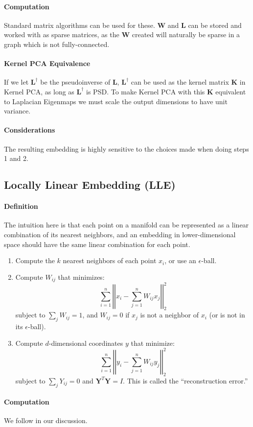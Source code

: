 \documentclass[12pt,a4paper]{article}
\newcommand{\1}[1]{\mathds{1}\left[#1\right]}
\newcommand{\B}[1]{\mathbf{#1}}
\begin{document}
\paragraph{Computation} Standard matrix algorithms can be used for these. $\B W$ and $\B L$ can be stored and worked with as sparse matrices, as the $\B W$ created will naturally be sparse in a graph which is not fully-connected.
\paragraph{Kernel PCA Equivalence} If we let $\B L^\dagger$ be the pseudoinverse of $\B L$, $\B L^\dagger$ can be used as the kernel matrix $\B K$ in Kernel PCA, as long as $\B L^\dagger$ is PSD. To make Kernel PCA with this $\B K$ equivalent to Laplacian Eigenmaps we must scale the output dimensions to have unit variance. \cite{fml}
\paragraph{Considerations} The resulting embedding is highly sensitive to the choices made when doing steps 1 and 2.
\subsection{Locally Linear Embedding (LLE)}
\paragraph{Definition} The intuition here is that each point on a manifold can be represented as a linear combination of its nearest neighbors, and an embedding in lower-dimensional space should have the same linear combination for each point.
\begin{enumerate}
    \item Compute the $k$ nearest neighbors of each point $x_i$, or use an $\epsilon$-ball.
    \item Compute $W_{ij}$ that minimizes:
        \[\sum_{i=1}^n\left|\left|x_i-\sum_{j=1}^nW_{ij}x_j\right|\right|_2^2\]
        subject to $\sum_j W_{ij}=1$, and $W_{ij}=0$ if $x_j$ is not a neighbor of $x_i$ (or is not in its $\epsilon$-ball).
    \item Compute $d$-dimensional coordinates $y$ that minimize:
        \[\sum_{i=1}^n\left|\left|y_i-\sum_{j=1}^nW_{ij}y_j\right|\right|_2^2\]
        subject to $\sum_{j}Y_{ij}=0$ and $\B Y^T\B Y=I$. This is called the ``reconstruction error.''
\end{enumerate}
\paragraph{Computation} We follow \cite{lleintro} in our discussion.
\end{document}
